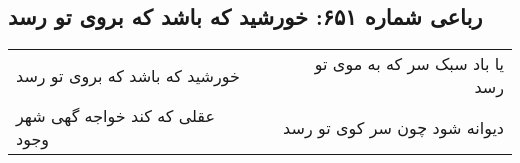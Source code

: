 \begin{center}
\section*{رباعی شماره ۶۵۱: خورشید که باشد که بروی تو رسد}
\label{sec:0651}
\begin{longtable}{l p{0.5cm} r}
خورشید که باشد که بروی تو رسد
&&
یا باد سبک سر که به موی تو رسد
\\
عقلی که کند خواجه گهی شهر وجود
&&
دیوانه شود چون سر کوی تو رسد
\\
\end{longtable}
\end{center}

